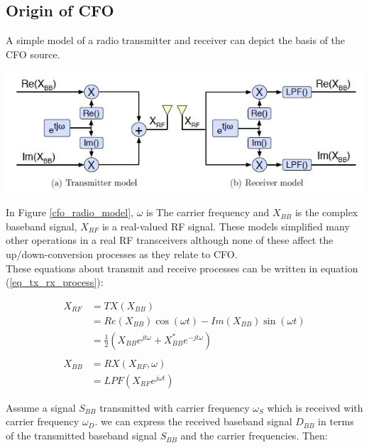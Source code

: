 \subsection{Origin of CFO}
A simple model of a radio transmitter and receiver can depict the basis of the CFO source.

\begin{center}
\includegraphics[width=\textwidth]{content/fig/cfo_radio_model.JPG}
\label{cfo_radio_model}
\end{center}

In Figure \ref{cfo_radio_model}, $\omega$ is The carrier frequency and $X_{BB}$ is the complex baseband signal, $X_{RF}$ is
a real-valued RF signal. These models simplified many other operations in a real RF transceivers although none of these affect the up/down-conversion processes as they relate to CFO.\\
These equations about transmit and receive processes can be written in equation (\ref{eq_tx_rx_process}):

\begin{equation}\label{eq_tx_rx_process}
\begin{split}
X_{RF} & = TX(X_{BB})\\
& = Re(X_{BB})\cos(\omega t) - Im(X_{BB})\sin(\omega t)\\
& = \frac{1}{2} (X_{BB} e^{jt\omega} + X^{*}_{BB} e^{-jt\omega})\\
\\
X_{BB} & = RX(X_{RF}, \omega)\\
& = LPF(X_{RF} e^{j\omega t})
\end{split}
\end{equation}


Assume a signal $S_{BB}$ transmitted with carrier frequency $\omega_{S}$ which is received with carrier frequency $\omega_{D}$. we can express the received baseband signal $D_{BB}$ in terms of the transmitted baseband signal $S_{BB}$ and the carrier frequencies. Then:\\

